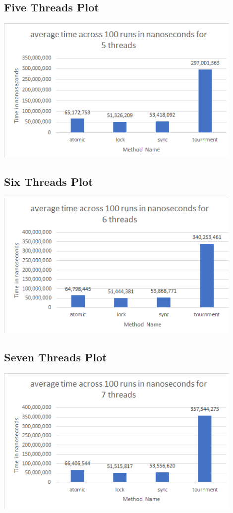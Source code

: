\documentclass{article}
\begin{document}
\subsection{Five Threads Plot}
\includegraphics[width=12cm]{5_threads}

\subsection{Six Threads Plot}
\includegraphics[width=12cm]{6_threads}

\subsection{Seven Threads Plot}
\includegraphics[width=12cm]{7_threads}
\end{document}
